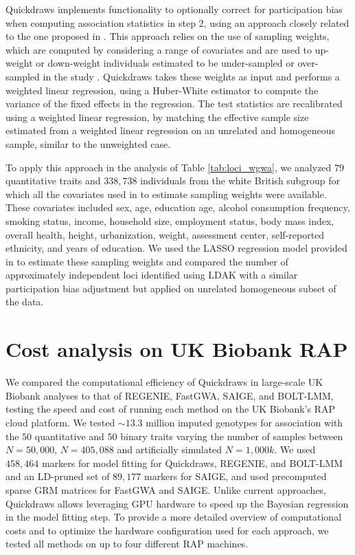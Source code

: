 Quickdraws implements functionality to optionally correct for participation bias when computing association statistics in step 2, using an approach closely related to the one proposed in \cite{schoeler2023participation}.
%
This approach relies on the use of sampling weights, which are computed by considering a range of covariates and are used to up-weight or down-weight individuals estimated to be under-sampled or over-sampled in the study \cite{schoeler2023participation}.
%
Quickdraws takes these weights as input and performs a weighted linear regression, using a Huber-White estimator to compute the variance of the fixed effects in the regression.
%
The test statistics are recalibrated using a weighted linear regression, by matching the effective sample size estimated from a weighted linear regression on an unrelated and homogeneous sample, similar to the unweighted case.
%

%
To apply this approach in the analysis of Table \ref{tab:loci_wgwa}, we analyzed $79$ quantitative traits and $338{,}738$ individuals from the white British subgroup for which all the covariates used in \cite{schoeler2023participation} to estimate sampling weights were available.
%
These covariates included sex, age, education age, alcohol consumption frequency, smoking status, income, household size, employment status, body mass index, overall health, height, urbanization, weight, assessment center, self-reported ethnicity, and years of education.
%
We used the LASSO regression model provided in \cite{schoeler2023participation} to estimate these sampling weights and compared the number of approximately independent loci identified using LDAK with a similar participation bias adjustment but applied on unrelated homogeneous subset of the data.
%

\section{Cost analysis on UK Biobank RAP}
\label{sec:ch5-cost}

We compared the computational efficiency of Quickdraws in large-scale UK Biobank analyses to that of REGENIE, FastGWA, SAIGE, and BOLT-LMM, testing the speed and cost of running each method on the UK Biobank's RAP cloud platform.
%
We tested ${\sim}13.3$ million imputed genotypes for association with the $50$ quantitative and $50$ binary traits varying the number of samples between $N=50{,}000$, $N=405{,}088$ and artificially simulated $N=1{,}000k$.
%
We used $458{,}464$ markers for model fitting for Quickdraws, REGENIE, and BOLT-LMM and an LD-pruned set of $89{,}177$ markers for SAIGE, and used precomputed sparse GRM matrices for FastGWA and SAIGE.
%
Unlike current approaches, Quickdraws allows leveraging GPU hardware to speed up the Bayesian regression in the model fitting step.
%
To provide a more detailed overview of computational costs and to optimize the hardware configuration used for each approach, we tested all methods on up to four different RAP machines.

